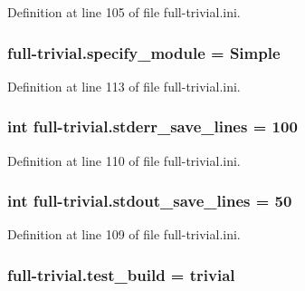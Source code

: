 Definition at line 105 of file full-\/trivial.\-ini.

\hypertarget{namespacefull-trivial_a8845e5ef8465c334338eba7b42c0c61c}{
\subsubsection[{specify\-\_\-module}]{\setlength{\rightskip}{0pt plus 5cm}full-\/trivial.\-specify\-\_\-module = Simple}}\label{namespacefull-trivial_a8845e5ef8465c334338eba7b42c0c61c}


Definition at line 113 of file full-\/trivial.\-ini.

\hypertarget{namespacefull-trivial_ab88dfbf498ed0d90e1a0510bbbb706fa}{
\subsubsection[{stderr\-\_\-save\-\_\-lines}]{\setlength{\rightskip}{0pt plus 5cm}int full-\/trivial.\-stderr\-\_\-save\-\_\-lines = 100}}\label{namespacefull-trivial_ab88dfbf498ed0d90e1a0510bbbb706fa}


Definition at line 110 of file full-\/trivial.\-ini.

\hypertarget{namespacefull-trivial_a701f09db43ab9e43a49aaf76aa97b131}{
\subsubsection[{stdout\-\_\-save\-\_\-lines}]{\setlength{\rightskip}{0pt plus 5cm}int full-\/trivial.\-stdout\-\_\-save\-\_\-lines = 50}}\label{namespacefull-trivial_a701f09db43ab9e43a49aaf76aa97b131}


Definition at line 109 of file full-\/trivial.\-ini.

\hypertarget{namespacefull-trivial_aa09bcc003045dcca018f705fcea70f0f}{
\subsubsection[{test\-\_\-build}]{\setlength{\rightskip}{0pt plus 5cm}full-\/trivial.\-test\-\_\-build = trivial}}\label{namespacefull-trivial_aa09bcc003045dcca018f705fcea70f0f}


